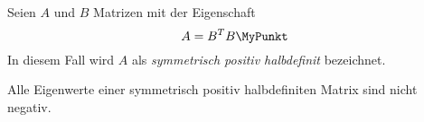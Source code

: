 \MyBeginDef
\label{DefPositivHalbdefinit}
    Seien $A$ und $B$ Matrizen mit der Eigenschaft
    \[ A = B^T B \MyPunkt \] In diesem Fall wird $A$ als
    {\em symmetrisch positiv halbdefinit} bezeichnet.
\MyEndDef

\begin{lemma}
\label{SatzDefinitEigenwert}
    Alle Eigenwerte einer symmetrisch positiv halbdefiniten Matrix sind
    nicht negativ.
\end{lemma}


